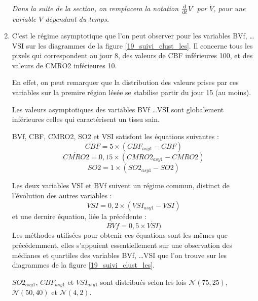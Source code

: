 \begin{enumerate}[label=\textbf{(L\'esion 1 - \arabic*)}]
\par
\emph{Dans la suite de la section, on remplacera la notation $\frac{\text{d}}{\text{d}t}V$ par $\dot{V}$, pour une variable $V$ d\'ependant du temps.}
\item C'est le r\'egime asymptotique que l'on peut observer pour les variables BVf, \dots VSI sur les diagrammes de la figure \ref{19_suivi_clust_les}. %
Il concerne tous les pixels qui correspondent au jour 8,  des valeurs de CBF inf\'erieures  100, et des valeurs de CMRO2 inf\'erieures  10.

\par
En effet, on peut remarquer que la distribution des valeurs prises par ces variables sur la premire r\'egion l\'es\'ee se stabilise  partir du jour 15 (au moins).

\par
Les valeurs asymptotiques des variables BVf \dots VSI sont globalement inf\'erieures  celles qui caract\'erisent un tissu sain.

\par
BVf, CBF, CMRO2, SO2 et VSI satisfont les \'equations suivantes :
\begin{equation}
\dot{CBF}=5\times\left(CBF_{asy1}-CBF\right)
\end{equation}
\begin{equation}
\dot{CMRO2}=0,15\times\left(CMRO2_{asy1}-CMRO2\right)
\end{equation}
\begin{equation}
\dot{SO2}=1\times\left(SO2_{asy1}-SO2\right)
\end{equation}

Les deux variables VSI et BVf suivent un r\'egime commun, distinct de l'\'evolution des autres variables :
\begin{equation}
\dot{VSI}=0,2\times (VSI_{asy1}-VSI)
\end{equation}
et une dernire \'equation, li\'ee  la pr\'ec\'edente :
\begin{equation}
\dot{BVf}=0,5\times\dot{VSI})
\end{equation}
Les m\'ethodes utilis\'ees pour obtenir ces \'equations sont les m\^emes que pr\'ec\'edemment, %
elles s'appuient essentiellement sur une observation des m\'edianes et quartiles des variables BVf, %
\dots VSI que l'on trouve sur les diagrammes de la figure \ref{19_suivi_clust_les}.

\par
$SO2_{asy1}$, $CBF_{asy1}$ et $VSI_{asy1}$ sont distribu\'es selon les lois $\mathcal{N}(75,25)$, $\mathcal{N}(50,40)$ et $\mathcal{N}(4,2)$.
\end{enumerate}

